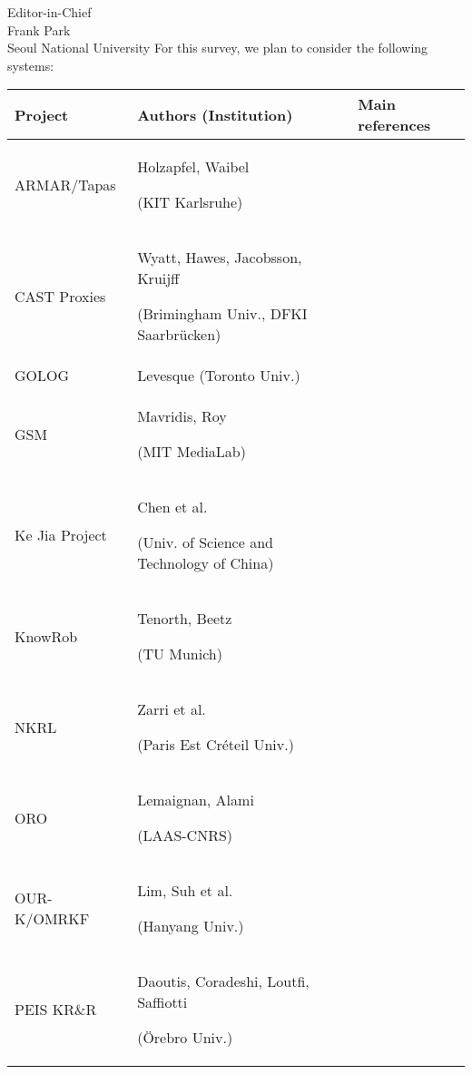\documentclass{letter}
\begin{document}
\begin{letter}{Editor-in-Chief \\ Frank Park \\ Seoul National University}
For this survey, we plan to consider the following systems:

\begin{tabular}{p{2.8cm}p{8cm}p{1.5cm}}
\toprule
{\bf Project} & {\bf Authors (Institution)} & Main references \\
\midrule
ARMAR/Tapas &  Holzapfel, Waibel \par (KIT Karlsruhe) &  \cite{Holzapfel2008}\\
CAST Proxies &  Wyatt, Hawes, Jacobsson, Kruijff \par (Brimingham Univ., DFKI Saarbrücken) &  \cite{jacobsson2008crossmodal} \\
GOLOG & Levesque (Toronto Univ.) & \cite{levesque1997golog} \\
GSM &  Mavridis, Roy \par (MIT MediaLab) & \cite{Mavridis2006} \\
Ke Jia Project & Chen et al. \par (Univ. of Science and Technology of China) &  \cite{Chen2010} \\
{\sc KnowRob} &  Tenorth, Beetz \par (TU Munich) &   \cite{Tenorth2009a} \\
NKRL &  Zarri et al. \par (Paris Est Créteil Univ.) &  \cite{Sabri2011} \\
ORO &  Lemaignan, Alami \par (LAAS-CNRS) &  \cite{Lemaignan2010} \\
OUR-K/OMRKF &  Lim, Suh et al. \par (Hanyang Univ.) &   \cite{Lim2011, Suh2007} \\
PEIS KR\&R &  Daoutis, Coradeshi, Loutfi, Saffiotti \par (Örebro Univ.) &  \cite{Daoutis2009} \\


\end{tabular}
\end{letter}
\end{document}

